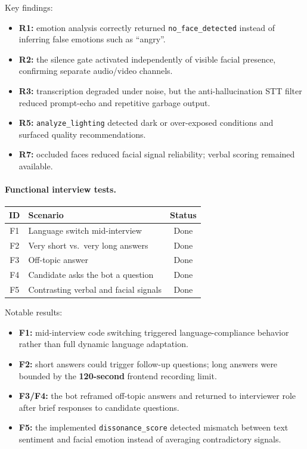 Key findings:
\begin{itemize}
    \item \textbf{R1:} emotion analysis correctly returned \texttt{no\_face\_detected} instead of inferring false emotions such as ``angry''.
    \item \textbf{R2:} the silence gate activated independently of visible facial presence, confirming separate audio/video channels.
    \item \textbf{R3:} transcription degraded under noise, but the anti-hallucination STT filter reduced prompt-echo and repetitive garbage output.
    \item \textbf{R5:} \texttt{analyze\_lighting} detected dark or over-exposed conditions and surfaced quality recommendations.
    \item \textbf{R7:} occluded faces reduced facial signal reliability; verbal scoring remained available.
\end{itemize}

\paragraph{Functional interview tests.}

\begin{center}
\label{tab:functional_interview_tests}
\renewcommand{\arraystretch}{1.1}
\begin{tabularx}{\textwidth}{|c|l|c|}
\hline
\rowcolor{gray!20} \textbf{ID} & \textbf{Scenario} & \textbf{Status} \\
\hline
F1 & Language switch mid-interview & Done \\
F2 & Very short vs.\ very long answers & Done \\
F3 & Off-topic answer & Done \\
F4 & Candidate asks the bot a question & Done \\
F5 & Contrasting verbal and facial signals & Done \\
\hline
\end{tabularx}
\end{center}

Notable results:
\begin{itemize}
    \item \textbf{F1:} mid-interview code switching triggered language-compliance behavior rather than full dynamic language adaptation.
    \item \textbf{F2:} short answers could trigger follow-up questions; long answers were bounded by the \textbf{120-second} frontend recording limit.
    \item \textbf{F3/F4:} the bot reframed off-topic answers and returned to interviewer role after brief responses to candidate questions.
    \item \textbf{F5:} the implemented \texttt{dissonance\_score} detected mismatch between text sentiment and facial emotion instead of averaging contradictory signals.
\end{itemize}

